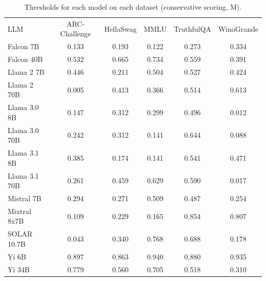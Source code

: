 \begin{table}[h]
\caption{Thresholds for each model on each dataset (conservative scoring, M). }
\label{tab:thresholds_prob_margin_k20_w2}
\centering
\begin{tabular}{l S[table-format=3.1] S[table-format=3.1] S[table-format=3.1] S[table-format=3.1] S[table-format=3.1]}
\toprule
LLM & ARC-Challenge & HellaSwag & MMLU & TruthfulQA & WinoGrande \\ 
\cmidrule(lr){1-1} \cmidrule(lr){2-2} \cmidrule(lr){3-3} \cmidrule(lr){4-4} \cmidrule(lr){5-5} \cmidrule(lr){6-6}
Falcon 7B & 0.133 & 0.193 & 0.122 & 0.273 & 0.334\\
Falcon 40B & 0.532 & 0.665 & 0.734 & 0.559 & 0.391\\
Llama 2 7B & 0.446 & 0.211 & 0.504 & 0.527 & 0.424\\
Llama 2 70B & 0.005 & 0.413 & 0.366 & 0.514 & 0.613\\
Llama 3.0 8B & 0.147 & 0.312 & 0.299 & 0.496 & 0.012\\
Llama 3.0 70B & 0.242 & 0.312 & 0.141 & 0.644 & 0.088\\
Llama 3.1 8B & 0.385 & 0.174 & 0.141 & 0.541 & 0.471\\
Llama 3.1 70B & 0.261 & 0.459 & 0.629 & 0.590 & 0.017\\
Mistral 7B & 0.294 & 0.271 & 0.509 & 0.487 & 0.254\\
Mixtral 8x7B & 0.109 & 0.229 & 0.165 & 0.854 & 0.807\\
SOLAR 10.7B & 0.043 & 0.340 & 0.768 & 0.688 & 0.178\\
Yi 6B & 0.897 & 0.863 & 0.940 & 0.880 & 0.935\\
Yi 34B & 0.779 & 0.560 & 0.705 & 0.518 & 0.310\\
\bottomrule
\end{tabular}
\end{table}
